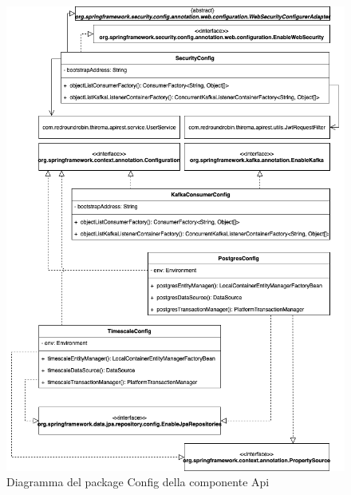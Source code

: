 		\begin{figure}[H]
			\centering
			\includegraphics[scale=0.550]{res/images/API/ConfigPackage.png}
			\caption{Diagramma del package Config della componente Api}
		\end{figure}
